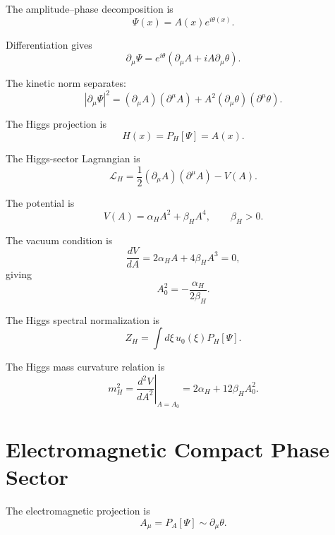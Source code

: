 \documentclass[11pt]{article}
\begin{document}
The amplitude--phase decomposition is
\begin{equation}
\boxed{
\Psi(x)=A(x)e^{i\theta(x)}.
}
\end{equation}

Differentiation gives
\begin{equation}
\partial_\mu\Psi
=
e^{i\theta}
\left(
\partial_\mu A+iA\partial_\mu\theta
\right).
\end{equation}

The kinetic norm separates:
\begin{equation}
\boxed{
|\partial_\mu\Psi|^2
=
(\partial_\mu A)(\partial^\mu A)
+
A^2(\partial_\mu\theta)(\partial^\mu\theta).
}
\end{equation}

The Higgs projection is
\begin{equation}
\boxed{
H(x)=P_H[\Psi]=A(x).
}
\end{equation}

The Higgs-sector Lagrangian is
\begin{equation}
\mathcal L_H
=
\frac12(\partial_\mu A)(\partial^\mu A)
-
V(A).
\end{equation}

The potential is
\begin{equation}
V(A)=\alpha_HA^2+\beta_HA^4,
\qquad
\beta_H>0.
\end{equation}

The vacuum condition is
\begin{equation}
\frac{dV}{dA}
=
2\alpha_HA+4\beta_HA^3=0,
\end{equation}
giving
\begin{equation}
A_0^2
=
-\frac{\alpha_H}{2\beta_H}.
\end{equation}

The Higgs spectral normalization is
\begin{equation}
\boxed{
Z_H
=
\int d\xi\,u_0(\xi)P_H[\Psi].
}
\end{equation}

The Higgs mass curvature relation is
\begin{equation}
\boxed{
m_H^2
=
\left.
\frac{d^2V}{dA^2}
\right|_{A=A_0}
=
2\alpha_H+12\beta_HA_0^2.
}
\end{equation}


\section{Electromagnetic Compact Phase Sector}

The electromagnetic projection is
\begin{equation}
\boxed{
A_\mu=P_A[\Psi]\sim\partial_\mu\theta.
}
\end{equation}
\end{document}
